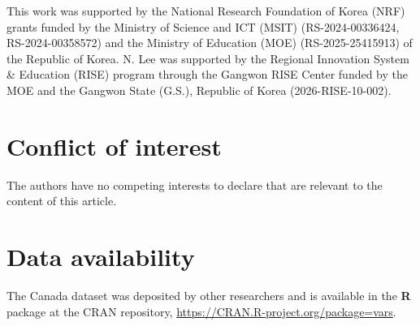 This work was supported by the National Research Foundation of Korea (NRF) grants funded by the Ministry of Science and ICT (MSIT) (RS-2024-00336424, RS-2024-00358572) and the Ministry of Education (MOE) (RS-2025-25415913) of the Republic of Korea. N. Lee was supported by the Regional Innovation System \& Education (RISE) program through the Gangwon RISE Center funded by the MOE and the Gangwon State (G.S.), Republic of Korea (2026-RISE-10-002).

\section*{Conflict of interest}\label{conflict-of-interest}

The authors have no competing interests to declare that are relevant to the content of this article.

\section*{Data availability}\label{data-availability}

The Canada dataset was deposited by other researchers and is available in the \textbf{R} package  at the CRAN repository, \url{https://CRAN.R-project.org/package=vars}.



\address{%
Namgil Lee\\
Kangwon National University\\%
Department of Information Statistics, Kangwon National University, Chuncheon, Gangwon 24341, Republic of Korea\\ Bionsight, Chuncheon, Gangwon 24341, Republic of Korea\\
%
%
\textit{ORCiD: \href{https://orcid.org/0000-0003-0593-9028}{0000-0003-0593-9028}}\\%
\href{mailto:namgil.lee@kangwon.ac.kr}{\nolinkurl{namgil.lee@kangwon.ac.kr}}%
}

\address{%
Sung-Ho Kim\\
KAIST\\%
Department of Mathematical Sciences, KAIST, Daejeon 34141, Republic of Korea\\
%
%
%
\href{mailto:sung-ho.kim@kaist.edu}{\nolinkurl{sung-ho.kim@kaist.edu}}%
}
